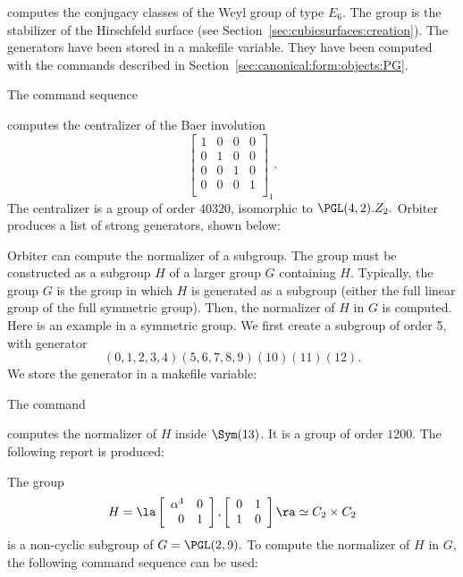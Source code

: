 computes the conjugacy classes of the Weyl group of type $E_6$. 
The group is the stabilizer of the Hirschfeld surface
(see Section~\ref{sec:cubicsurfaces:creation}). 
The generators have been stored in a makefile variable. 
They have been computed with the commands described in 
Section~\ref{sec:canonical:form:objects:PG}.





\bigskip

The command sequence 


computes the centralizer of the Baer involution
$$
\left[
\begin{array}{cccc}
	1&0&0&0\\
	0&1&0&0\\
	0&0&1&0\\
	0&0&0&1\\
\end{array}
\right]_1.
$$
The centralizer is a group of order $40320$, isomorphic to $\PGL(4,2).Z_2.$ 
Orbiter produces a list of strong generators, shown below: 

\bigskip



Orbiter can compute the normalizer of a subgroup. 
The group must be constructed as a subgroup $H$ of a larger group $G$ containing $H$.
Typically, the group $G$ is the group in which $H$ is generated as a subgroup 
(either the full linear group of the full symmetric group).
Then, the normalizer of $H$ in $G$ is computed. 
Here is an example in a symmetric group. 
We first create a subgroup of order 5, with generator 
$$
(0,1,2,3,4)(5,6,7,8,9)(10)(11)(12).
$$
We store the generator in a makefile variable:


The command


computes the normalizer of $H$ inside $\Sym(13)$. 
It is a group of order $1200$. 
The following report is produced:


\bigskip




The group 
$$
H = \la
\left[
\begin{array}{*{2}{r}}
\alpha^{4} & 0\\
0 & 1\\
\end{array}
\right]
, 
\left[
\begin{array}{*{2}{r}}
0 & 1\\
1 & 0\\
\end{array}
\right]
\ra \simeq C_2 \times C_2
$$
is a non-cyclic subgroup of $G=\PGL(2,9).$ 
To compute the normalizer of $H$ in $G$, 
the following command sequence can be used:

